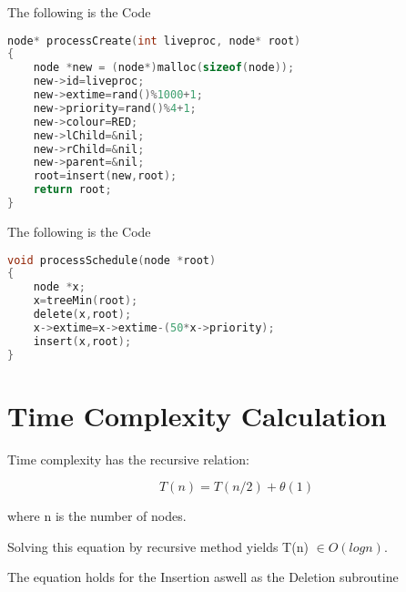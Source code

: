 \documentclass{article}
\begin{document}
The following is the Code
\begin{lstlisting}[language=c, caption=process create]
node* processCreate(int liveproc, node* root)
{
    node *new = (node*)malloc(sizeof(node));
    new->id=liveproc;
    new->extime=rand()%1000+1;
    new->priority=rand()%4+1;
    new->colour=RED;
    new->lChild=&nil;
    new->rChild=&nil;
    new->parent=&nil;
    root=insert(new,root);
    return root;
}
\end{lstlisting}

The following is the Code
\begin{lstlisting}[language=c, caption=process schedule]
void processSchedule(node *root)
{
    node *x;
    x=treeMin(root);
    delete(x,root);
    x->extime=x->extime-(50*x->priority);
    insert(x,root);
}
\end{lstlisting}

\section{Time Complexity Calculation}

Time complexity has the recursive relation:

\[ T(n) = T(n/2) + \theta(1) \]

where n is the number of nodes.

Solving this equation by recursive method yields T(n) $\in O(log n)$.

The equation holds for the Insertion aswell as the Deletion subroutine
\end{document}
